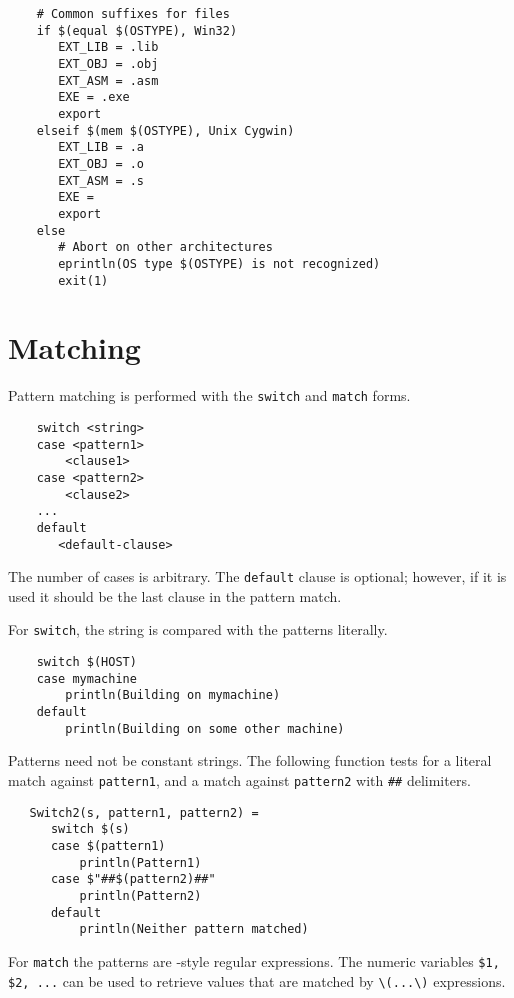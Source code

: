 \begin{verbatim}
    # Common suffixes for files
    if $(equal $(OSTYPE), Win32)
       EXT_LIB = .lib
       EXT_OBJ = .obj
       EXT_ASM = .asm
       EXE = .exe
       export
    elseif $(mem $(OSTYPE), Unix Cygwin)
       EXT_LIB = .a
       EXT_OBJ = .o
       EXT_ASM = .s
       EXE =
       export
    else
       # Abort on other architectures
       eprintln(OS type $(OSTYPE) is not recognized)
       exit(1)
\end{verbatim}

\section{Matching}
\label{section:match}

Pattern matching is performed with the \verb+switch+ and \verb+match+ forms.

\begin{verbatim}
    switch <string>
    case <pattern1>
        <clause1>
    case <pattern2>
        <clause2>
    ...
    default
       <default-clause>
\end{verbatim}

The number of cases is arbitrary.
The \verb+default+ clause is optional; however, if it is used it should
be the last clause in the pattern match.

For \verb+switch+, the string is compared with the patterns literally.

\begin{verbatim}
    switch $(HOST)
    case mymachine
        println(Building on mymachine)
    default
        println(Building on some other machine)
\end{verbatim}

Patterns need not be constant strings.  The following function tests
for a literal match against \verb+pattern1+, and a match against
\verb+pattern2+ with \verb+##+ delimiters.

\begin{verbatim}
   Switch2(s, pattern1, pattern2) =
      switch $(s)
      case $(pattern1)
          println(Pattern1)
      case $"##$(pattern2)##"
          println(Pattern2)
      default
          println(Neither pattern matched)
\end{verbatim}

For \verb+match+ the patterns are -style regular expressions.
The numeric variables \verb+$1, $2, ...+ can be used to retrieve values
that are matched by \verb+\(...\)+ expressions.

